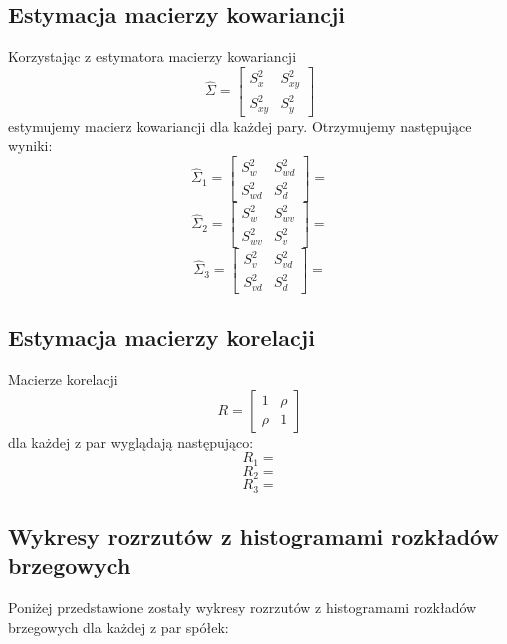 \documentclass[a4paper,11pt]{article}
\begin{document}
\subsection{Estymacja macierzy kowariancji}
Korzystając z estymatora macierzy kowariancji
$$
\hat{\Sigma}=
\begin{bmatrix}
    S^2_x & S^2_{xy} \\
    S^2_{xy} & S^2_y
\end{bmatrix}
$$
estymujemy macierz kowariancji dla każdej pary. Otrzymujemy następujące wyniki:
$$
\hat{\Sigma}_1=
\begin{bmatrix}
    S^2_w & S^2_{wd} \\
    S^2_{wd} & S^2_d
\end{bmatrix}
=
$$
$$
\hat{\Sigma}_2=
\begin{bmatrix}
    S^2_w & S^2_{wv} \\
    S^2_{wv} & S^2_v
\end{bmatrix}
=
$$
$$
\hat{\Sigma}_3=
\begin{bmatrix}
    S^2_v & S^2_{vd} \\
    S^2_{vd} & S^2_d
\end{bmatrix}
=
$$

\subsection{Estymacja macierzy korelacji}
Macierze korelacji
$$R=
\begin{bmatrix}
    1 & \rho \\
    \rho & 1 
\end{bmatrix}$$
dla każdej z par wyglądają następująco:
$$R_1=$$
$$R_2=$$
$$R_3=$$

\newpage\subsection{Wykresy rozrzutów z histogramami rozkładów brzegowych}
Poniżej przedstawione zostały wykresy rozrzutów z histogramami rozkładów brzegowych dla każdej z par spółek:
\end{document}
